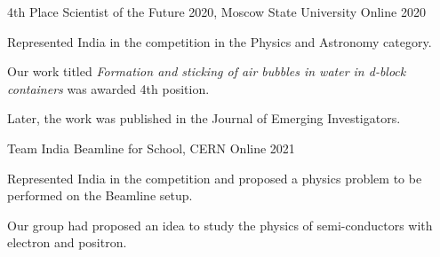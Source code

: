 



\begin{cventries}
  \cventry
  {4th Place} %
  {Scientist of the Future 2020, Moscow State University} %
  {Online} %
  {2020} %
  {
    \begin{cvitems}
      \item Represented India in the competition in the Physics and Astronomy category.
      \item Our work titled \emph{Formation and sticking of air bubbles in water in d-block containers} was awarded 4th position. 
      \item Later, the work was published in the Journal of Emerging Investigators.  
    \end{cvitems}
  }

  \cventry
  {Team India} %
  {Beamline for School, CERN} %
  {Online} %
  {2021} %
  {
    \begin{cvitems}
      \item Represented India in the competition and proposed a physics problem to be performed on the Beamline setup.
      \item Our group had proposed an idea to study the physics of semi-conductors with electron and positron.
    \end{cvitems}
  }
\end{cventries}

\vspace{0.5cm}

